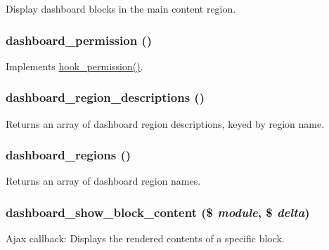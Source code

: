Display dashboard blocks in the main content region. \hypertarget{dashboard_8module_ae4348345274280e037d81be3211df773}{
\subsubsection[{dashboard\_\-permission}]{\setlength{\rightskip}{0pt plus 5cm}dashboard\_\-permission ()}}
\label{dashboard_8module_ae4348345274280e037d81be3211df773}
Implements \hyperlink{group__hooks_ga2b22b45f4925f2478412477bae329713}{hook\_\-permission()}. \hypertarget{dashboard_8module_a23d85f4c4aadbcc16a39bc7267689dea}{
\subsubsection[{dashboard\_\-region\_\-descriptions}]{\setlength{\rightskip}{0pt plus 5cm}dashboard\_\-region\_\-descriptions ()}}
\label{dashboard_8module_a23d85f4c4aadbcc16a39bc7267689dea}
Returns an array of dashboard region descriptions, keyed by region name. \hypertarget{dashboard_8module_aa1609a0c67095a8c58a242d2a7e470bd}{
\subsubsection[{dashboard\_\-regions}]{\setlength{\rightskip}{0pt plus 5cm}dashboard\_\-regions ()}}
\label{dashboard_8module_aa1609a0c67095a8c58a242d2a7e470bd}
Returns an array of dashboard region names. \hypertarget{dashboard_8module_a801487bbf9658e337fe3b1b434979420}{
\subsubsection[{dashboard\_\-show\_\-block\_\-content}]{\setlength{\rightskip}{0pt plus 5cm}dashboard\_\-show\_\-block\_\-content (\$ {\em module}, \/  \$ {\em delta})}}
\label{dashboard_8module_a801487bbf9658e337fe3b1b434979420}
Ajax callback: Displays the rendered contents of a specific block.


